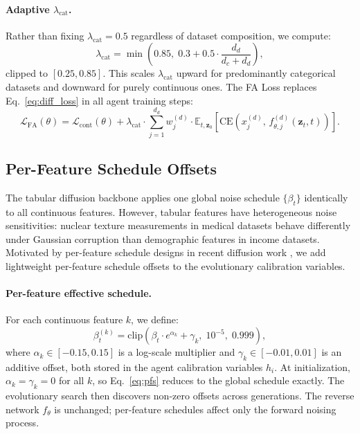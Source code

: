 \documentclass[preprint,12pt]{elsarticle}
\begin{document}
\paragraph{Adaptive $\lambda_{\text{cat}}$.}
Rather than fixing $\lambda_{\text{cat}} = 0.5$ regardless of dataset composition, we compute:
\begin{equation}
\lambda_{\text{cat}} = \min\!\left(0.85,\; 0.3 + 0.5 \cdot \frac{d_d}{d_c + d_d}\right),
\label{eq:auto_lambda}
\end{equation}
clipped to $[0.25, 0.85]$. This scales $\lambda_{\text{cat}}$ upward for predominantly categorical datasets and downward for purely continuous ones. The FA Loss replaces Eq.~\eqref{eq:diff_loss} in all agent training steps:
\begin{equation}
\mathcal{L}_{\text{FA}}(\theta) = \mathcal{L}_{\text{cont}}(\theta) + \lambda_{\text{cat}} \cdot \sum_{j=1}^{d_d} w_j^{(d)} \cdot \mathbb{E}_{t, \mathbf{z}_0}\!\left[\mathrm{CE}\!\left(x_j^{(d)},\, f_{\theta,j}^{(d)}(\mathbf{z}_t, t)\right)\right].
\label{eq:fa_loss}
\end{equation}

\subsection{Per-Feature Schedule Offsets}
\label{sec:method_pfs}

The tabular diffusion backbone applies one global noise schedule $\{\beta_t\}$ identically to all continuous features. However, tabular features have heterogeneous noise sensitivities: nuclear texture measurements in medical datasets behave differently under Gaussian corruption than demographic features in income datasets. Motivated by per-feature schedule designs in recent diffusion work \cite{VillaizanVallelado2025}, we add lightweight per-feature schedule offsets to the evolutionary calibration variables.

\paragraph{Per-feature effective schedule.}
For each continuous feature $k$, we define:
\begin{equation}
\beta_t^{(k)} = \mathrm{clip}\!\left(\beta_t \cdot e^{\alpha_k} + \gamma_k,\; 10^{-5},\; 0.999\right),
\label{eq:pfs}
\end{equation}
where $\alpha_k \in [-0.15, 0.15]$ is a log-scale multiplier and $\gamma_k \in [-0.01, 0.01]$ is an additive offset, both stored in the agent calibration variables $h_i$. At initialization, $\alpha_k = \gamma_k = 0$ for all $k$, so Eq.~\eqref{eq:pfs} reduces to the global schedule exactly. The evolutionary search then discovers non-zero offsets across generations. The reverse network $f_\theta$ is unchanged; per-feature schedules affect only the forward noising process.
\end{document}
